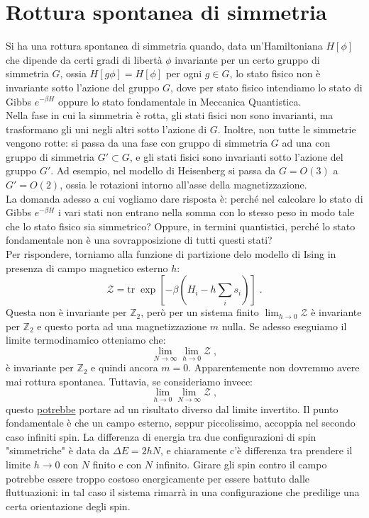 \documentclass[10pt,a4paper]{report}
\theoremstyle{definition}
\numberwithin{equation}{section}
\newcommand{\tr}{\mathrm{tr}}
\newcommand{\zpart}{\mathcal{Z}}
\begin{document}
\section{Rottura spontanea di simmetria}
Si ha una rottura spontanea di simmetria quando, data un'Hamiltoniana $H[\phi]$ che dipende da certi gradi di libertà $\phi$ invariante per un certo gruppo di simmetria $G$, ossia $H[g\phi]=H[\phi]$ per ogni $g\in G$, lo stato fisico non è invariante sotto l'azione del gruppo $G$, dove per stato fisico intendiamo lo stato di Gibbs $e^{-\beta H}$ oppure lo stato fondamentale in Meccanica Quantistica. \\
Nella fase in cui la simmetria è rotta, gli stati fisici non sono invarianti, ma trasformano gli uni negli altri sotto l'azione di $G$. Inoltre, non tutte le simmetrie vengono rotte: si passa da una fase con gruppo di simmetria $G$ ad una con gruppo di simmetria $G'\subset G$, e gli stati fisici sono invarianti sotto l'azione del gruppo $G'$. Ad esempio, nel modello di Heisenberg si passa da $G=O(3)$ a $G'=O(2)$, ossia le rotazioni intorno all'asse della magnetizzazione.\\
La domanda adesso a cui vogliamo dare risposta è: perché nel calcolare lo stato di Gibbs $e^{-\beta H}$ i vari stati non entrano nella somma con lo stesso peso in modo tale che lo stato fisico sia simmetrico? Oppure, in termini quantistici, perché lo stato fondamentale non è una sovrapposizione di tutti questi stati? \\
Per rispondere, torniamo alla funzione di partizione delo modello di Ising in presenza di campo magnetico esterno $h$:
\begin{equation}
\zpart=\tr\;\exp\left[-\beta\left(H_i-h\sum_is_i\right)\right]\;.
\end{equation}
Questa non è invariante per $\mathbb{Z}_2$, però per un sistema finito $\lim_{h\to 0} \zpart$ è invariante per $\mathbb{Z}_2$ e questo porta ad una magnetizzazione $m$ nulla. Se adesso eseguiamo il limite termodinamico otteniamo che:
\begin{equation}
\lim_{N\to\infty}\lim_{h\to 0}\zpart\;,
\end{equation}
è invariante per $\mathbb{Z}_2$ e quindi ancora $m=0$. Apparentemente non dovremmo avere mai rottura spontanea. Tuttavia, se consideriamo invece:
\begin{equation}
\lim_{h\to 0}\lim_{N\to\infty}\zpart\;,
\end{equation}
questo \underline{potrebbe} portare ad un risultato diverso dal limite invertito. Il punto fondamentale è che un campo esterno, seppur piccolissimo, accoppia nel secondo caso infiniti spin. La differenza di energia tra due configurazioni di spin "simmetriche" è data da $\Delta E=2hN$, e chiaramente c'è differenza tra prendere il limite $h\to 0$ con $N$ finito e con $N$ infinito. Girare gli spin contro il campo potrebbe essere troppo costoso energicamente per essere battuto dalle fluttuazioni: in tal caso il sistema rimarrà in una configurazione che predilige una certa orientazione degli spin. \\
\end{document}
